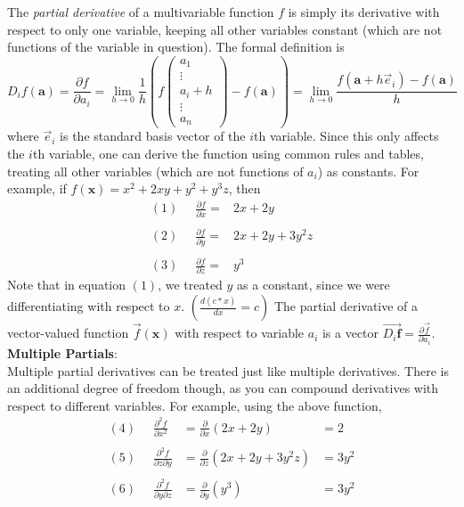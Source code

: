 \documentclass[12pt]{article}
\begin{document}
The \emph{partial derivative} of a multivariable function $f$ is simply its derivative with respect to only one variable, keeping all other variables constant (which are not functions of the variable in question). The formal definition is
$$D_if(\mathbf{a})=\frac{\partial f}{\partial a_i} = \lim_{h\rightarrow 0}\frac{1}{h}\left(f\left(\begin{array}{c}a_1\\ \vdots\\a_i+h\\ \vdots\\a_n\end{array}\right) - f\left(\mathbf{a}\right)\right)
= \lim_{h\rightarrow 0}\frac{f(\mathbf{a}+h\vec{e}_i)-f(\mathbf{a})}{h}$$ where $\vec{e}_i$ is the standard basis vector of the $i$th variable. Since this only affects the $i$th variable, one can derive the function using common rules and tables, treating all other variables (which are not functions of $a_i$) as constants. For example, if $f(\mathbf{x})=x^2 + 2xy + y^2 + y^3z$, then\\
$$\begin{array}{lll}
(1)\;\; & \frac{\partial f}{\partial x} = & 2x + 2y\\
&&\\
(2)\;\; & \frac{\partial f}{\partial y} = & 2x + 2y + 3y^2z\\
&&\\
(3)\;\; & \frac{\partial f}{\partial z} = & y^3
\end{array}$$
Note that in equation $(1)$, we treated $y$ as a constant, since we were differentiating with respect to $x$. $\left(\frac{d(c*x)}{dx} = c\right)$ The partial derivative of a vector-valued function $\vec{f}(\mathbf{x})$ with respect to variable $a_i$ is a vector $\overrightarrow{D_i\mathbf{f}}=\frac{\partial\vec{f}}{\partial a_i}$.\\
\textbf{Multiple Partials}:\\
Multiple partial derivatives can be treated just like multiple derivatives. There is an additional degree of freedom though, as you can compound derivatives with respect to different variables. For example, using the above function,
$$\begin{array}{llll}
(4)\;\; & \frac{\partial^2 f}{\partial x^2} & = \frac{\partial}{\partial x}(2x + 2y) & = 2\\
&&&\\
(5)\;\; & \frac{\partial^2 f}{\partial z \partial y} & = \frac{\partial}{\partial z}(2x + 2y + 3y^2z) & = 3y^2\\
&&&\\
(6)\;\; & \frac{\partial^2 f}{\partial y \partial z} & = \frac{\partial}{\partial y}(y^3) & = 3y^2
\end{array}$$
\end{document}
